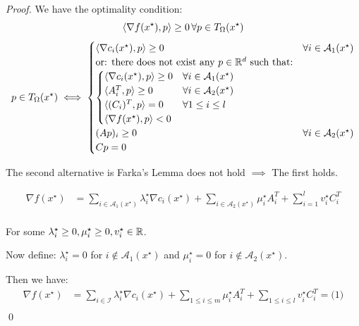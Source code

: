 \begin{proof}{}{}
  We have the optimality condition:
  \[
    \langle\nabla f(x^\star), p\rangle \geq 0 \, \forall p \in T_{\Omega}(x^\star)
  \]
  \medskip
  \begin{align*}
    p \in T_{\Omega}(x^\star) \iff
    \begin{cases}
      \langle\nabla c_i (x^\star), p \rangle\geq 0 & \forall i \in \mathcal{A}_1(x^\star)                         \\
      \text{or: there does not exist any } p \in \mathbb{R}^d \text{ such that:} & \\
      \begin{cases}
        \langle\nabla c_i (x^\star), p \rangle\geq 0 & \forall i \in \mathcal{A}_1(x^\star) \\
        \langle A_i^T , p \rangle\geq 0               & \forall i \in \mathcal{A}_2(x^\star) \\
        \langle (C_i )^T, p \rangle = 0              & \forall 1 \leq i \leq l              \\
        \langle\nabla f (x^\star), p \rangle < 0     & 
      \end{cases}                             \\
      (Ap)_i \geq 0 & \forall i \in \mathcal{A}_2(x^\star)                                                      \\
      Cp = 0        &
    \end{cases}
  \end{align*}

  The second alternative is Farka's Lemma does not hold \(\implies\) The first holds.

  \begin{align*}
    \nabla f(x^\star) & = \sum_{i\in \mathcal{A}_1(x^\star)} \lambda_i^\star \nabla c_i(x^\star) + \sum_{i \in \mathcal{A}_2(x^\star)} \mu_i^\star A_i^T + \sum_{i=1}^l v_i^\star C_i^T \\
  \end{align*}

  For some  \(\lambda_i^\star \geq 0, \mu_i^\star \geq 0, v_i^\star \in \mathbb{R}\).

  Now define: \(\lambda_i^\star = 0 \) for \(i \notin \mathcal{A}_1(x^\star)\) and \(\mu_i^\star = 0\) for \(i \notin \mathcal{A}_2(x^\star)\).

  Then we have:
  \begin{align*}
    \nabla f(x^\star) & = \sum_{i\in \mathcal{I}} \lambda_i^\star \nabla c_i(x^\star) + \sum_{1 \leq i \leq m} \mu_i^\star A_i^T + \sum_{1 \leq i \leq l} v_i^\star C_i^T = \text{(1)} \\
  \end{align*}
  \qed
\end{proof}

